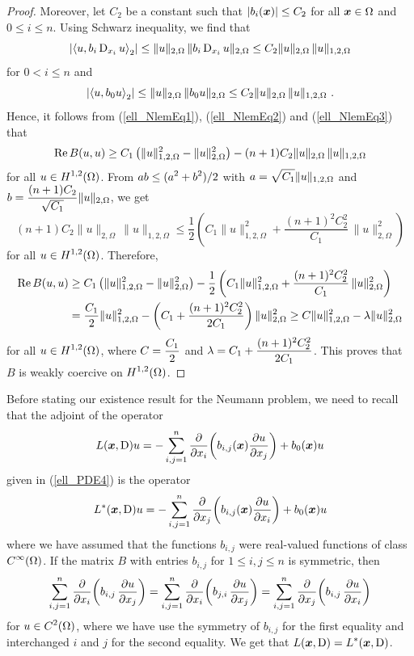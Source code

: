 \begin{proof}
Moreover, let $C_2$ be a constant such that $|b_i(\VEC{x})| \leq C_2$ for all
$\VEC{x} \in \Omega$ and $0\leq i \leq n$.  Using Schwarz inequality,
we find that
\begin{equation} \label{ell_NlemEq2}
\left| \ps{u}{b_i \diff_{x_i} u}_2 \right| \leq
\|u\|_{2,\Omega} \,\| b_i \diff_{x_i} u \|_{2,\Omega}
\leq C_2 \|u\|_{2,\Omega} \,\|u\|_{1,2,\Omega}
\end{equation}
for $0 <i \leq n$ and
\begin{equation} \label{ell_NlemEq3}
\left| \ps{u}{b_0 u}_2 \right| \leq 
\|u\|_{2,\Omega} \, \|b_0 u \|_{2,\Omega}
\leq C_2 \|u\|_{2,\Omega} \, \|u\|_{1,2,\Omega} \ .
\end{equation}
Hence, it follows from (\ref{ell_NlemEq1}), (\ref{ell_NlemEq2}) and
(\ref{ell_NlemEq3}) that
\[
\RE B(u,u) \geq C_1 \left( \|u\|_{1,2,\Omega}^2 - \|u\|_{2,\Omega}^2 \right) -
(n+1)C_2 \|u\|_{2,\Omega} \, \|u\|_{1,2,\Omega}
\]
for all $\DS u \in H^{1,2}(\Omega)$.  From
$\DS ab \leq (a^2+b^2)/2$ with
$\DS a = \sqrt{C_1} \|u\|_{1,2,\Omega}$ and
$\DS b = \frac{(n+1)C_2}{\sqrt{C_1}} \|u\|_{2,\Omega}$, we get
\[
(n+1)C_2 \|u\|_{2,\Omega} \, \|u\|_{1,2,\Omega}
\leq \frac{1}{2} \left(
C_1 \|u\|_{1,2,\Omega}^2 + \frac{(n+1)^2C_2^2}{C_1} \, \|u\|_{2,\Omega}^2 \right)
\]
for all $\DS u \in H^{1,2}(\Omega)$.  Therefore,
\begin{align*}
\RE B(u,u) &\geq C_1 \left( \|u\|_{1,2,\Omega}^2 - \|u\|_{2,\Omega}^2 \right) -
\frac{1}{2} \left(
C_1 \|u\|_{1,2,\Omega}^2 + \frac{(n+1)^2C_2^2}{C_1} \,
\|u\|_{2,\Omega}^2 \right) \\
&= \frac{C_1}{2} \|u\|_{1,2,\Omega}^2 -
\left( C_1 + \frac{(n+1)^2C_2^2}{2C_1}\right) \|u\|_{2,\Omega}^2
\geq C \|u\|_{1,2,\Omega}^2 - \lambda \|u\|_{2,\Omega}^2
\end{align*}
for all $\DS u \in H^{1,2}(\Omega)$, where
$\DS C= \frac{C_1}{2}$ and
$\DS \lambda = C_1 + \frac{(n+1)^2C_2^2}{2C_1}$.
This proves that $B$ is weakly coercive on $\DS H^{1,2}(\Omega)$.
\end{proof}

Before stating our existence result for the Neumann problem, we need to
recall that the adjoint of the operator
\[
L(\VEC{x}, \diff)u = -\sum_{i,j=1}^n
\pdfdx{\left( b_{i,j}(\VEC{x}) \pdydx{u}{x_j} \right)}{x_i} + b_0(\VEC{x})u
\]
given in (\ref{ell_PDE4}) is the operator
\[
L^\ast(\VEC{x}, \diff)u = -\sum_{i,j=1}^n
\pdfdx{\left( b_{i,j}(\VEC{x}) \pdydx{u}{x_i} \right)}{x_j} + b_0(\VEC{x})u
\]
where we have assumed that the functions $b_{i,j}$ were real-valued
functions of class $\DS C^\infty(\Omega)$.  If the
matrix $B$ with entries $b_{i,j}$ for $1\leq i,j\leq n$ is symmetric, then
\[
\sum_{i,j=1}^n \pdfdx{\left( b_{i,j}\,\pdydx{u}{x_j}\right)}{x_i}
= \sum_{i,j=1}^n \pdfdx{\left( b_{j,i}\,\pdydx{u}{x_j}\right)}{x_i}
= \sum_{i,j=1}^n \pdfdx{\left( b_{i,j}\,\pdydx{u}{x_i}\right)}{x_j}
\]
for $\DS u \in C^2(\Omega)$, where we have use the symmetry
of $b_{i,j}$ for the first equality and interchanged $i$ and $j$ for
the second equality.  We get that
$\DS L(\VEC{x},\diff) = L^\ast(\VEC{x},\diff)$.

